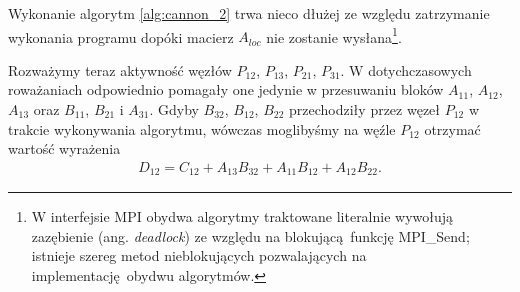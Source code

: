 Wykonanie algorytm \ref{alg:cannon_2} trwa nieco dłużej ze względu zatrzymanie wykonania programu dopóki macierz \(A_{loc}\) nie zostanie wysłana\footnote{W interfejsie MPI obydwa algorytmy traktowane literalnie wywołują zazębienie (ang. \emph{deadlock}) ze względu na blokującą funkcję MPI\_Send; istnieje szereg metod nieblokujących pozwalających na implementację obydwu algorytmów.}.

Rozważymy teraz aktywność węzłów \(P_{12}\), \(P_{13}\), \(P_{21}\), \(P_{31}\). W dotychczasowych roważaniach odpowiednio pomagały one jedynie w przesuwaniu bloków \(A_{11}\), \(A_{12}\), \(A_{13}\) oraz \(B_{11}\), \(B_{21}\) i \(A_{31}\). Gdyby \(B_{32}\), \(B_{12}\), \(B_{22}\) przechodziły przez węzeł \(P_{12}\) w trakcie wykonywania algorytmu, wówczas moglibyśmy na węźle \(P_{12}\) otrzymać wartość wyrażenia
\begin{align*}
D_{12} = C_{12} + A_{13}B_{32} + A_{11}B_{12} + A_{12}B_{22}.
\end{align*}

